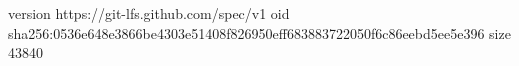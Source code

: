 version https://git-lfs.github.com/spec/v1
oid sha256:0536e648e3866be4303e51408f826950eff683883722050f6c86eebd5ee5e396
size 43840
